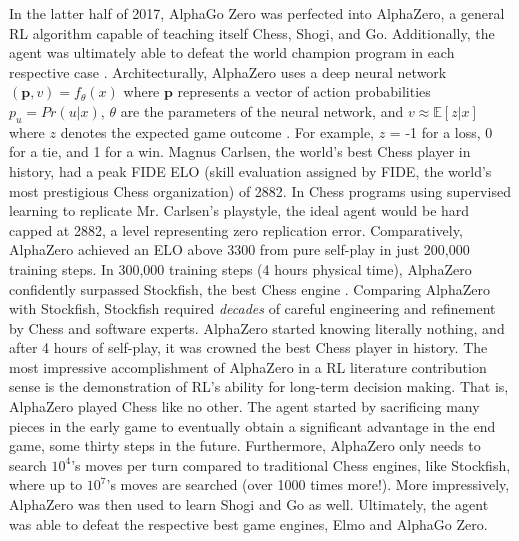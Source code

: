 In the latter half of 2017, AlphaGo Zero was perfected into AlphaZero, a general RL algorithm capable of teaching itself Chess, Shogi, and Go.  Additionally, the agent was ultimately able to defeat the world champion program in each respective case \cite{alphazero1, alphazero2, alphazero3}. Architecturally, AlphaZero uses a deep neural network $(\textbf{p}, v) = f_{\theta}(x)$ where $\textbf{p}$ represents a vector of action probabilities $p_u = Pr(u|x)$, $\theta$ are the parameters of the neural network, and $v \approx \mathbb{E}[z|x]$ where $z$ denotes the expected game outcome \cite{alphazero3}. For example, $z$ = -1 for a loss, 0 for a tie, and 1 for a win. Magnus Carlsen, the world's best Chess player in history, had a peak FIDE ELO (skill evaluation assigned by FIDE, the world's most prestigious Chess organization) of 2882.  In Chess programs using supervised learning to replicate Mr. Carlsen's playstyle, the ideal agent would be hard capped at 2882, a level representing zero replication error. Comparatively, AlphaZero achieved an ELO above 3300 from pure self-play in just 200,000 training steps. In 300,000 training steps (4 hours physical time), AlphaZero confidently surpassed Stockfish, the best Chess engine \cite{stockfish}.  Comparing AlphaZero with Stockfish, Stockfish required \textit{decades} of careful engineering and refinement by Chess and software experts.  AlphaZero started knowing literally nothing, and after 4 hours of self-play, it was crowned the best Chess player in history. The most impressive accomplishment of AlphaZero in a RL literature contribution sense is the demonstration of RL's ability for long-term decision making. That is, AlphaZero played Chess like no other.  The agent started by sacrificing many pieces in the early game to eventually obtain a significant advantage in the end game, some thirty steps in the future. Furthermore, AlphaZero only needs to search $10^4$'s moves per turn compared to traditional Chess engines, like Stockfish, where up to $10^7$'s moves are searched (over 1000 times more!). More impressively, AlphaZero was then used to learn Shogi and Go as well. Ultimately, the agent was able to defeat the respective best game engines, Elmo and AlphaGo Zero.

